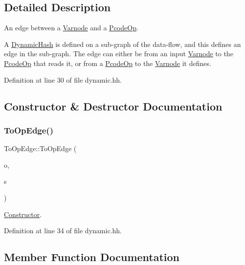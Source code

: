\subsection{Detailed Description}
An edge between a \mbox{\hyperlink{class_varnode}{Varnode}} and a \mbox{\hyperlink{class_pcode_op}{Pcode\+Op}}. 

A \mbox{\hyperlink{class_dynamic_hash}{Dynamic\+Hash}} is defined on a sub-\/graph of the data-\/flow, and this defines an edge in the sub-\/graph. The edge can either be from an input \mbox{\hyperlink{class_varnode}{Varnode}} to the \mbox{\hyperlink{class_pcode_op}{Pcode\+Op}} that reads it, or from a \mbox{\hyperlink{class_pcode_op}{Pcode\+Op}} to the \mbox{\hyperlink{class_varnode}{Varnode}} it defines. 

Definition at line 30 of file dynamic.\+hh.



\subsection{Constructor \& Destructor Documentation}
\mbox{\label{class_to_op_edge_a21ac9abba2a0057fedddf9d50b4bb747}} 
\subsubsection{\texorpdfstring{ToOpEdge()}{ToOpEdge()}}
{\footnotesize\ttfamily To\+Op\+Edge\+::\+To\+Op\+Edge (\begin{DoxyParamCaption}\item[{const \mbox{\hyperlink{class_pcode_op}{Pcode\+Op}} $\ast$}]{o,  }\item[{int4}]{s }\end{DoxyParamCaption})\hspace{0.3cm}{\ttfamily [inline]}}



\mbox{\hyperlink{class_constructor}{Constructor}}. 



Definition at line 34 of file dynamic.\+hh.



\subsection{Member Function Documentation}
\mbox{\label{class_to_op_edge_aa3a15c158a60145471dcd8072c3f9683}} 
